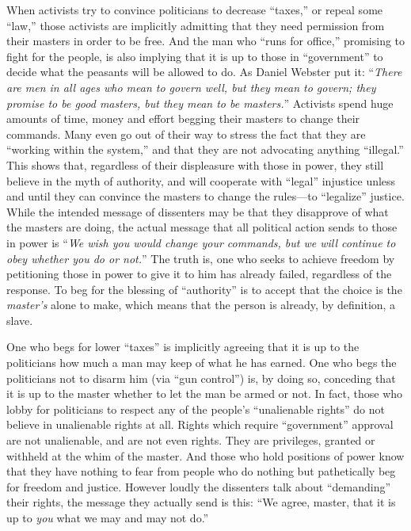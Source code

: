 \documentclass{book}
\begin{document}
When activists try to convince politicians to decrease \enquote{taxes,} or repeal some \enquote{law,} those activists are implicitly admitting that they need permission from their masters in order to be free. And the man who \enquote{runs for office,} promising to fight for the people, is also implying that it is up to those in \enquote{government} to decide what the peasants will be allowed to do. As Daniel Webster put it: \enquote{\emph{There are men in all ages who mean to govern well, but they mean to govern; they promise to be good masters, but they mean to be masters.}} Activists spend huge amounts of time, money and effort begging their masters to change their commands. Many even go out of their way to stress the fact that they are \enquote{working within the system,} and that they are not advocating anything \enquote{illegal.} This shows that, regardless of their displeasure with those in power, they still believe in the myth of authority, and will cooperate with \enquote{legal} injustice unless and until they can convince the masters to change the rules---to \enquote{legalize} justice. While the intended message of dissenters may be that they disapprove of what the masters are doing, the actual message that all political action sends to those in power is \enquote{\emph{We wish you would change your commands, but we will continue to obey whether you do or not.}} The truth is, one who seeks to achieve freedom by petitioning those in power to give it to him has already failed, regardless of the response. To beg for the blessing of \enquote{authority} is to accept that the choice is the \emph{master's} alone to make, which means that the person is already, by definition, a slave.

One who begs for lower \enquote{taxes} is implicitly agreeing that it is up to the politicians how much a man may keep of what he has earned. One who begs the politicians not to disarm him (via \enquote{gun control}) is, by doing so, conceding that it is up to the master whether to let the man be armed or not. In fact, those who lobby for politicians to respect any of the people's \enquote{unalienable rights} do not believe in unalienable rights at all. Rights which require \enquote{government} approval are not unalienable, and are not even rights. They are privileges, granted or withheld at the whim of the master. And those who hold positions of power know that they have nothing to fear from people who do nothing but pathetically beg for freedom and justice. However loudly the dissenters talk about \enquote{demanding} their rights, the message they actually send is this: \enquote{We agree, master, that it is up to \emph{you} what we may and may not do.}
\end{document}
